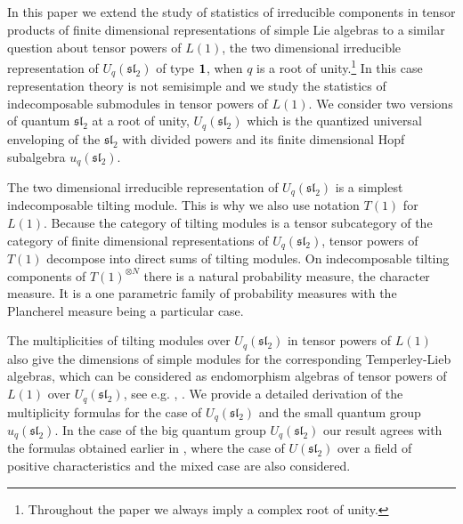 \documentclass[11pt]{amsart}
\begin{document}
\subsection{} In this paper we extend the study of statistics of irreducible components in tensor products of finite dimensional representations of simple Lie algebras \cite{K,B,TZ,PR1} to a similar question about tensor powers of $L(1)$, the two dimensional irreducible representation of $U_q(\mathfrak{sl}_2)$ of type ${\bf 1}$, when $q$ is a root of unity.\footnote{Throughout the paper we always imply a complex root of unity.} In this case representation theory is not semisimple and we study the statistics of indecomposable submodules in tensor powers of $L(1)$. We consider two versions of quantum $\mathfrak{sl}_2$ at a root of unity, $U_q(\mathfrak{sl}_2)$ which is the quantized universal enveloping of the $\mathfrak{sl}_2$ with divided powers \cite{Lus89} and its finite dimensional Hopf subalgebra $u_q(\mathfrak{sl}_2)$.


The two dimensional irreducible representation of $U_q(\mathfrak{sl}_2)$ is a simplest indecomposable tilting module. This is why we also use notation $T(1)$ for $L(1)$. Because the category of tilting modules is a tensor subcategory of the category of finite dimensional representations of $U_q(\mathfrak{sl}_2)$, tensor powers of $T(1)$ decompose into direct sums of tilting modules. On indecomposable tilting components of $T(1)^{\otimes N}$ there is a natural probability measure, the character measure. It is a one parametric family of probability measures with the Plancherel measure being a particular case.


The multiplicities of tilting modules over $U_q(\mathfrak{sl}_2)$ in tensor powers of $L(1)$ also give the dimensions of simple modules for the corresponding Temperley-Lieb algebras, which can be considered as endomorphism algebras of tensor powers of $L(1)$ over $U_q(\mathfrak{sl}_2)$, see e.g. \cite{AST}, \cite{ILZ}. We provide a detailed derivation of the multiplicity formulas for the case of $U_q(\mathfrak{sl}_2)$ and the small quantum group $u_q(\mathfrak{sl}_2)$. In the case of the big quantum group $U_q(\mathfrak{sl}_2)$ our result agrees with the formulas obtained earlier in \cite{And17}, where the case of $U(\mathfrak{sl}_2)$ over a field of positive characteristics and the mixed case are also considered.
\end{document}

